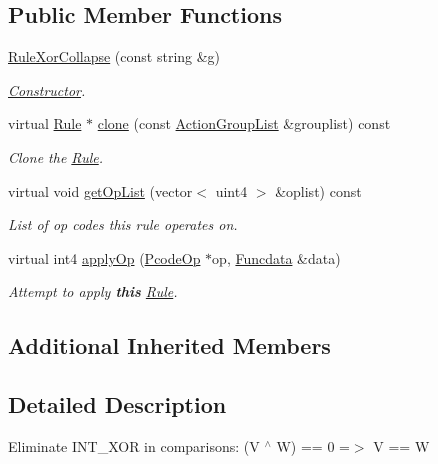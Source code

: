 \subsection*{Public Member Functions}
\begin{DoxyCompactItemize}
\item 
\mbox{\hyperlink{class_rule_xor_collapse_aff446187c0a50efe605d0371cc3aa23b}{Rule\+Xor\+Collapse}} (const string \&g)
\begin{DoxyCompactList}\small\item\em \mbox{\hyperlink{class_constructor}{Constructor}}. \end{DoxyCompactList}\item 
virtual \mbox{\hyperlink{class_rule}{Rule}} $\ast$ \mbox{\hyperlink{class_rule_xor_collapse_a48b66467d8d326b7c4da8f6eb3110970}{clone}} (const \mbox{\hyperlink{class_action_group_list}{Action\+Group\+List}} \&grouplist) const
\begin{DoxyCompactList}\small\item\em Clone the \mbox{\hyperlink{class_rule}{Rule}}. \end{DoxyCompactList}\item 
virtual void \mbox{\hyperlink{class_rule_xor_collapse_ab744a2a37f1908003ac8ef28ab2614f5}{get\+Op\+List}} (vector$<$ uint4 $>$ \&oplist) const
\begin{DoxyCompactList}\small\item\em List of op codes this rule operates on. \end{DoxyCompactList}\item 
virtual int4 \mbox{\hyperlink{class_rule_xor_collapse_a66798e6a5cdb2306f61f2596db611045}{apply\+Op}} (\mbox{\hyperlink{class_pcode_op}{Pcode\+Op}} $\ast$op, \mbox{\hyperlink{class_funcdata}{Funcdata}} \&data)
\begin{DoxyCompactList}\small\item\em Attempt to apply {\bfseries{this}} \mbox{\hyperlink{class_rule}{Rule}}. \end{DoxyCompactList}\end{DoxyCompactItemize}
\subsection*{Additional Inherited Members}


\subsection{Detailed Description}
Eliminate I\+N\+T\+\_\+\+X\+OR in comparisons\+: {\ttfamily (V $^\wedge$ W) == 0 =$>$ V == W} 

